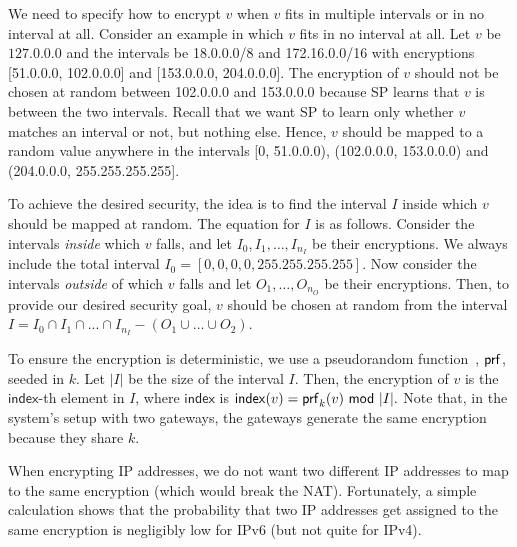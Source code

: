 We need to specify how to encrypt $v$ when $v$ fits in multiple intervals or in no interval at all. Consider an example in which $v$ fits in no interval at all. Let $v$ be $127.0.0.0$ and the intervals be 18.0.0.0/8 and 172.16.0.0/16 with encryptions [51.0.0.0, 102.0.0.0] and [153.0.0.0, 204.0.0.0]. The encryption of $v$ should not be chosen at random between  102.0.0.0 and 153.0.0.0 because SP learns that $v$ is between the two intervals. Recall that we want SP  to learn only whether $v$ matches an interval or not, but nothing else. Hence, $v$ should be mapped to a random value anywhere in the intervals [0, 51.0.0.0), (102.0.0.0, 153.0.0.0) and (204.0.0.0, 255.255.255.255]. 

To achieve the desired security, the idea is to find the interval $I$ inside which $v$ should be mapped at random. The equation for $I$ is as follows. Consider the intervals {\em inside} which $v$ falls, and let $I_0, I_1, \dots, I_{n_I}$ be their encryptions. We always include the total interval $I_0 = [0,0,0,0, 255.255.255.255]$. Now consider the intervals {\em outside} of which $v$ falls and let $O_1, \dots, O_{n_O}$ be their encryptions. Then, to provide our desired security goal, $v$ should be chosen at random from the interval  
$ I = I_0 \cap I_1 \cap ... \cap I_{n_I} - (O_1 \cup \dots \cup O_2). $


 


To ensure the encryption is deterministic, we use a pseudorandom function~\cite{GoldreichVol1}, $\mathsf{prf}$, seeded in $k$.   Let $|I|$ be the size of the interval $I$. 
Then, the encryption of $v$ is the $\mathsf{index}$-th element in $I$, where $\mathsf{index}$ is 
$ \mathsf{index}(v) = \prf_k(v)\ \mod\ |I|. $ 
  Note that, in the system's setup with two gateways, the gateways generate the same encryption because they share $k$. 

When encrypting IP addresses, we do not want two different IP addresses to map to the same encryption (which would break the NAT). Fortunately,  a simple calculation shows that the probability that two IP addresses get assigned to the same encryption is negligibly low for IPv6 (but not quite for IPv4).  %

